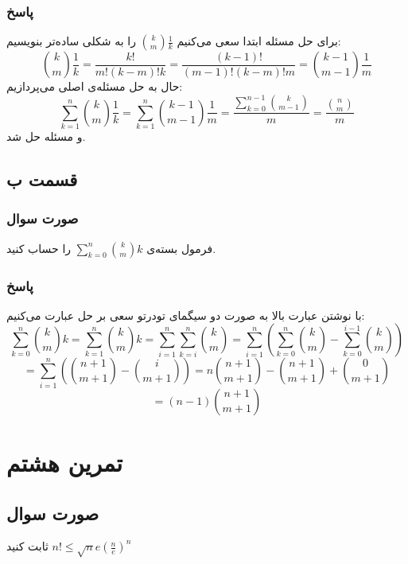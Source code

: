 \documentclass[12pt,a4paper]{article}
\begin{document}
\subsubsection{پاسخ}
برای حل مسئله ابتدا سعی می‌کنیم
$\binom{k}{m}\frac{1}{k}$
را به شکلی ساده‌تر بنویسیم:
\[
\binom{k}{m}\frac{1}{k} = \frac{k!}{m!(k-m)!k} = \frac{(k-1)!}{(m-1)!(k-m)!m}
= \binom{k-1}{m-1}\frac{1}{m}
\]
حال به حل مسئله‌ی اصلی می‌پردازیم:
\[
\sum_{k=1}^n \binom{k}{m}\frac{1}{k} = \sum_{k=1}^n \binom{k-1}{m-1}\frac{1}{m}
= \frac{\sum_{k=0}^{n-1} \binom{k}{m-1}}{m} 
= \frac{\binom{n}{m}}{m}
\]
و مسئله حل شد.
\subsection{قسمت ب}
\subsubsection{صورت سوال}
فرمول بسته‌ی 
$\sum_{k=0}^n \binom{k}{m}k$
را حساب کنید.
\subsubsection{پاسخ}
با نوشتن عبارت بالا به صورت دو سیگمای تودرتو سعی بر حل عبارت می‌کنیم:
\[
\sum_{k=0}^n \binom{k}{m}k = \sum_{k=1}^n \binom{k}{m}k = \sum_{i=1}^n \sum_{k=i}^{n} \binom{k}{m}
= \sum_{i=1}^n\left( \sum_{k=0}^n \binom{k}{m} - \sum_{k=0}^{i-1} \binom{k}{m}\right)
\]
\[
= \sum_{i=1}^n\left( \binom{n+1}{m+1} - \binom{i}{m+1}\right)
= n\binom{n+1}{m+1} - \binom{n+1}{m+1} + \binom{0}{m+1}
\]
\[
= (n-1)\binom{n+1}{m+1}
\]

\section{تمرین هشتم}
\subsection{صورت سوال}
ثابت کنید
$n! \leq \sqrt{n}e \left(\frac{n}{e}\right)^n$
\end{document}
